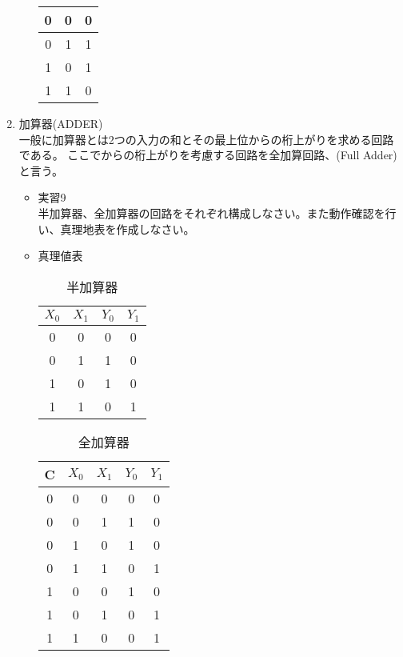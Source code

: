 \documentclass[dvipdfmx]{jsarticle}
\begin{document}
\begin{enumerate}
\begin{itemize}
\begin{table}[H]
\begin{tabular}{|c|c|c|}
											0 & 0 & 0\\ \hline
											0 & 1 & 1\\ \hline
											1 & 0 & 1\\ \hline
											1 & 1 & 0\\ \hline
										\end{tabular}
									\end{table}
							\end{itemize}
						\item 加算器(ADDER) \\
							一般に加算器とは2つの入力の和とその最上位からの桁上がりを求める回路である。
							ここでからの桁上がりを考慮する回路を全加算回路、(Full Adder)と言う。
							\begin{itemize}
								\item 実習9\\
								半加算器、全加算器の回路をそれぞれ構成しなさい。また動作確認を行い、真理地表を作成しなさい。
								\item 真理値表
									\begin{table}[H]
										\center
										\caption{半加算器\label{tb:half-adder}}
										\begin{tabular}{|c|c|c|c|}
											\hline
											$X_0$ & $X_1$ & $Y_0$ &$Y_1$ \\ \hline
											0 & 0 & 0 & 0 \\ \hline
											0 & 1 & 1 & 0\\ \hline
											1 & 0 & 1 & 0\\ \hline
											1 & 1 & 0 & 1\\ \hline
										\end{tabular}
									\end{table}
									\begin{table}[H]
										\center
										\caption{全加算器\label{tb:half-adder}}
										\begin{tabular}{|c|c|c|c|c|}
											\hline
											C & $X_0$ & $X_1$ & $Y_0$ &$Y_1$ \\ \hline
											0 & 0 & 0 & 0 & 0 \\ \hline
											0 & 0 & 1 & 1 & 0\\ \hline
											0 & 1 & 0 & 1 & 0\\ \hline
											0 & 1 & 1 & 0 & 1\\ \hline
											1 & 0 & 0 & 1 & 0 \\ \hline
											1 & 0 & 1 & 0 & 1\\ \hline
											1 & 1 & 0 & 0 & 1\\ \hline

\end{tabular}
\end{table}
\end{itemize}
\end{enumerate}
\end{document}
